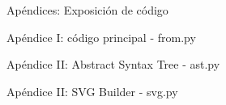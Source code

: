 \begin{section}{Ap\'endices: Exposici\'on de c\'odigo}

\begin{subsection}{Ap\'endice I: c\'odigo principal - from.py}

	

\end{subsection}

\begin{subsection}{Ap\'endice II: Abstract Syntax Tree - ast.py}

	

\end{subsection}

\begin{subsection}{Ap\'endice II: SVG Builder - svg.py}

	

\end{subsection}

\end{section}